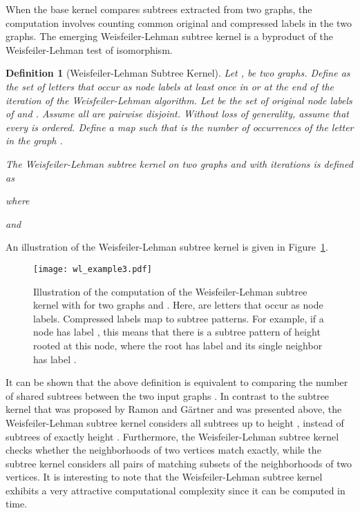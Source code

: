 \documentclass[twoside,11pt]{article}
\newtheorem{definition}{Definition}
\begin{document}
When the base kernel compares subtrees extracted from two graphs, the computation involves counting common original and compressed labels in the two graphs.
The emerging Weisfeiler-Lehman subtree kernel is a byproduct of the Weisfeiler-Lehman test of isomorphism.
\begin{definition}[Weisfeiler-Lehman Subtree Kernel]
  Let ,  be two graphs.
  Define  as the set of letters that occur as node labels at least once in  or  at the end of the  iteration of the Weisfeiler-Lehman algorithm.
  Let  be the set of original node labels of  and .
  Assume all  are pairwise disjoint.
  Without loss of generality, assume that every  is ordered.
  Define a map  such that  is the number of occurrences of the letter  in the graph .

  The Weisfeiler-Lehman subtree kernel on two graphs  and  with  iterations is defined as
  
  where
  
  and
  
\end{definition}
An illustration of the Weisfeiler-Lehman subtree kernel is given in Figure~\ref{fig:wl_example}.
\begin{figure}[t]
    \centering
    \texttt{[image: wl\_example3.pdf]}
    \caption{Illustration of the computation of the Weisfeiler-Lehman subtree kernel with  for two  graphs  and . Here,  are letters that occur as node labels. Compressed labels map to subtree patterns. For example, if a node has label , this means that there is a subtree pattern of height  rooted at this node, where the root has label  and its single neighbor has label .}
    \label{fig:wl_example}
\end{figure}
It can be shown that the above definition is equivalent to comparing the number of shared subtrees between the two input graphs \cite{shervashidze2011weisfeiler}.
In contrast to the subtree kernel that was proposed by Ramon and G{\"a}rtner and was presented above, the Weisfeiler-Lehman subtree kernel considers all subtrees up to height , instead of subtrees of exactly height .
Furthermore, the Weisfeiler-Lehman subtree kernel checks whether the neighborhoods of two vertices match exactly, while the subtree kernel considers all pairs of matching subsets of the neighborhoods of two vertices.
It is interesting to note that the Weisfeiler-Lehman subtree kernel exhibits a very attractive computational complexity since it can be computed in  time.
\end{document}

